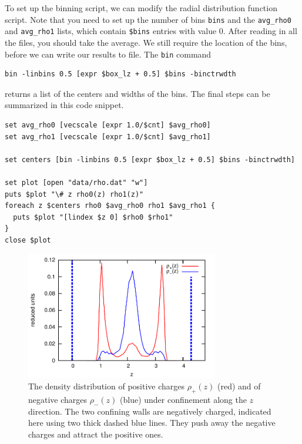 \documentclass[
a4paper,                        %
11pt,                           %
twoside,                        %
footsepline,                    %
headsepline,                    %
headexclude,                    %
footexclude,                    %
pagesize,                       %
]{scrartcl}
\begin{document}
To set up the binning script, we can modify the radial distribution function script. Note that you need to set up the number of bins \texttt{bins} and the \texttt{avg\_rho0} and \texttt{avg\_rho1} lists, which contain \texttt{\$bins} entries with value 0. After reading in all the files, you should take the average. We still require the location of the bins, before we can write our results to file. The \verb|bin| command

{\small\vspace{0,2cm}
\begin{lstlisting}[numbers=none]
bin -linbins 0.5 [expr $box_lz + 0.5] $bins -binctrwdth
\end{lstlisting}\vspace{0,2cm}
}

\noindent returns a list of the centers and widths of the bins. The final steps can be summarized in this code snippet. 

{\small\vspace{0,2cm}
\begin{lstlisting}[numbers=none]
set avg_rho0 [vecscale [expr 1.0/$cnt] $avg_rho0]
set avg_rho1 [vecscale [expr 1.0/$cnt] $avg_rho1]

set centers [bin -linbins 0.5 [expr $box_lz + 0.5] $bins -binctrwdth]

set plot [open "data/rho.dat" "w"]
puts $plot "\# z rho0(z) rho1(z)"
foreach z $centers rho0 $avg_rho0 rho1 $avg_rho1 {
  puts $plot "[lindex $z 0] $rho0 $rho1"
}
close $plot
\end{lstlisting}\vspace{0,2cm}
}

\begin{figure}[!ht]
\begin{center}
\includegraphics[width=0.75\textwidth]{figures/rho}
\caption{\label{fig:rho} The density distribution of positive charges $\rho_{+}(z)$ (red) and of negative charges $\rho_{-}(z)$ (blue) under confinement along the $z$ direction. The two confining walls are negatively charged, indicated here using two thick dashed blue lines. They push away the negative charges and attract the positive ones.}
\end{center}
\end{figure}
\end{document}
